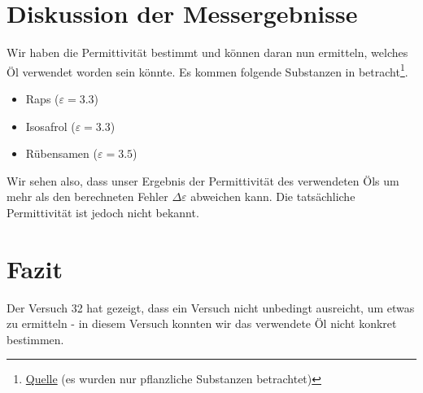 \documentclass[10pt,a4paper]{article}
\newcommand{\vnr}{32}
\begin{document}
\section{Diskussion der Messergebnisse}
\begin{flushleft}
Wir haben die Permittivität bestimmt und können daran nun ermitteln, welches Öl verwendet worden sein könnte. Es kommen folgende Substanzen in betracht\footnote{\href{https://www.vega.com/-/media/PDF-files/Dielektrizitaetszahl-Liste_DE.pdf}{Quelle} (es wurden nur pflanzliche Substanzen betrachtet)}.
\begin{itemize}[itemsep=0pt]
\item Raps ($\varepsilon = 3.3$)
\item Isosafrol ($\varepsilon = 3.3$)
\item Rübensamen ($\varepsilon = 3.5$)
\end{itemize}
Wir sehen also, dass unser Ergebnis der Permittivität des verwendeten Öls um mehr als den berechneten Fehler $\Delta \varepsilon$ abweichen kann. Die tatsächliche Permittivität ist jedoch nicht bekannt.
\end{flushleft}

\section{Fazit}
\begin{flushleft}
Der Versuch \vnr\vspace{1pt} hat gezeigt, dass ein Versuch nicht unbedingt ausreicht, um etwas zu ermitteln - in diesem Versuch konnten wir das verwendete Öl nicht konkret bestimmen.
\end{flushleft}

\begingroup
\raggedright
\sloppy
\printbibliography[heading=bibintoc,title={6 \hspace{6pt} Literatur}]
\endgroup
\end{document}
